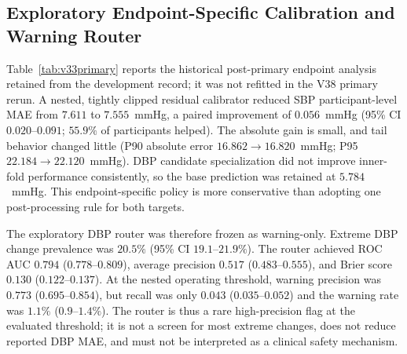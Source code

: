 \subsection{Exploratory Endpoint-Specific Calibration and Warning Router}
\label{sec:v34}
Table~\ref{tab:v33primary} reports the historical post-primary endpoint analysis retained from the development record; it was not refitted in the V38 primary rerun. A nested, tightly clipped residual calibrator reduced SBP participant-level MAE from $7.611$ to $7.555$~mmHg, a paired improvement of $0.056$~mmHg (95\% CI $0.020$--$0.091$; $55.9\%$ of participants helped). The absolute gain is small, and tail behavior changed little (P90 absolute error $16.862 \to 16.820$~mmHg; P95 $22.184 \to 22.120$~mmHg). DBP candidate specialization did not improve inner-fold performance consistently, so the base prediction was retained at $5.784$~mmHg. This endpoint-specific policy is more conservative than adopting one post-processing rule for both targets.
\begin{table}[t]
\centering
\caption{Exploratory Endpoint-Specific Nested Analysis (653 Participants)}
\label{tab:v33primary}
\scriptsize
{}
\end{table}
The exploratory DBP router was therefore frozen as warning-only. Extreme DBP change prevalence was $20.5\%$ (95\% CI $19.1$--$21.9\%$). The router achieved ROC AUC $0.794$ ($0.778$--$0.809$), average precision $0.517$ ($0.483$--$0.555$), and Brier score $0.130$ ($0.122$--$0.137$). At the nested operating threshold, warning precision was $0.773$ ($0.695$--$0.854$), but recall was only $0.043$ ($0.035$--$0.052$) and the warning rate was $1.1\%$ ($0.9$--$1.4\%$). The router is thus a rare high-precision flag at the evaluated threshold; it is not a screen for most extreme changes, does not reduce reported DBP MAE, and must not be interpreted as a clinical safety mechanism.
